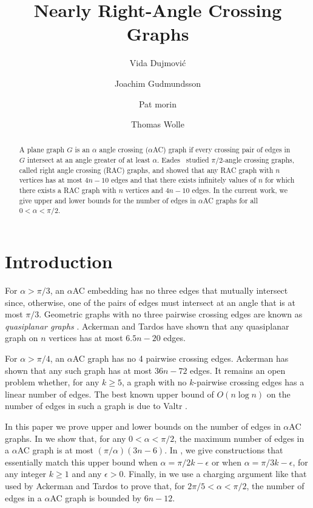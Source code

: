 \documentclass[lotsofwhite,charterfonts]{patmorin}
\title{Nearly Right-Angle Crossing Graphs}
\author{Vida Dujmovi\'c 
	\and Joachim Gudmundsson
	\and Pat morin
	\and Thomas Wolle}
\begin{document}
\maketitle

\begin{abstract}
A plane graph $G$ is an $\alpha$ angle crossing ($\alpha$AC) graph if
every crossing pair of edges in $G$ intersect at an angle greater of at
least $\alpha$. 
Eades \etal\ studied $\pi/2$-angle crossing graphs, called
right angle crossing (RAC) graphs, and showed that any RAC graph with $n$
vertices has at most $4n-10$ edges and that there exists infinitely values
of $n$ for which there exists a RAC graph with $n$ vertices and $4n-10$
edges.
In the current work, we give upper and lower bounds for the number of edges
in $\alpha$AC graphs for all $0 < \alpha < \pi/2$.
\end{abstract}

\section{Introduction}

For $\alpha > \pi/3$, an $\alpha$AC embedding has no three edges that
mutually intersect since, otherwise, one of the pairs of edges must
intersect at an angle that is at most $\pi/3$.  Geometric graphs with no
three pairwise crossing edges are known as \emph{quasiplanar graphs}
\cite{aapps97}. Ackerman and Tardos \cite[Theorem~5]{atXX} have shown that
any quasiplanar graph on $n$ vertices has at most $6.5n - 20$ edges. 

For $\alpha > \pi/4$, an $\alpha$AC graph has no 4 pairwise crossing edges.
Ackerman has shown that any such graph has at most $36n - 72$ edges.  It
remains an open problem whether, for any $k\ge 5$, a graph with no
$k$-pairwise crossing edges has a linear number of edges.  The best known
upper bound of $O(n\log n)$ on the number of edges in such a graph is due
to Valtr \cite[Theorem~3]{v99}.

In this paper we prove upper and lower bounds on the number of edges in
$\alpha$AC graphs.  In  we show that, for any $0< \alpha
<\pi/2$, the maximum number of edges in a $\alpha$AC graph is at most
$(\pi/\alpha)(3n-6)$.  In , we give constructions that
essentially match this upper bound when $\alpha = \pi/2k-\epsilon$ or when
$\alpha = \pi/ 3k-\epsilon$, for any integer $k \ge 1$ and any $\epsilon >
0$.  Finally, in  we use a charging argument like that
used by Ackerman and Tardos to prove that, for $2\pi/5 < \alpha < \pi/2$,
the number of edges in a $\alpha$AC graph is bounded by $6n-12$.
\end{document}
